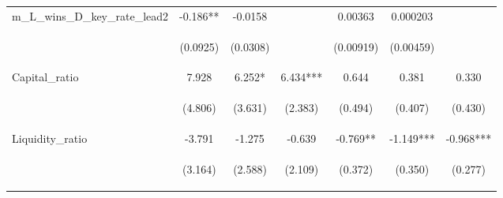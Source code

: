 \documentclass[]{article}
\begin{document}
\begin{center}
\begin{tabular}{lcccccc}
m\_L\_wins\_D\_key\_rate\_lead2 & -0.186** & -0.0158 &  & 0.00363 & 0.000203 &  \\
\vspace{4pt} & \begin{footnotesize}(0.0925)\end{footnotesize} & \begin{footnotesize}(0.0308)\end{footnotesize} & \begin{footnotesize}\end{footnotesize} & \begin{footnotesize}(0.00919)\end{footnotesize} & \begin{footnotesize}(0.00459)\end{footnotesize} & \begin{footnotesize}\end{footnotesize} \\
Capital\_ratio & 7.928 & 6.252* & 6.434*** & 0.644 & 0.381 & 0.330 \\
\vspace{4pt} & \begin{footnotesize}(4.806)\end{footnotesize} & \begin{footnotesize}(3.631)\end{footnotesize} & \begin{footnotesize}(2.383)\end{footnotesize} & \begin{footnotesize}(0.494)\end{footnotesize} & \begin{footnotesize}(0.407)\end{footnotesize} & \begin{footnotesize}(0.430)\end{footnotesize} \\
Liquidity\_ratio & -3.791 & -1.275 & -0.639 & -0.769** & -1.149*** & -0.968*** \\
\vspace{4pt} & \begin{footnotesize}(3.164)\end{footnotesize} & \begin{footnotesize}(2.588)\end{footnotesize} & \begin{footnotesize}(2.109)\end{footnotesize} & \begin{footnotesize}(0.372)\end{footnotesize} & \begin{footnotesize}(0.350)\end{footnotesize} & \begin{footnotesize}(0.277)\end{footnotesize} \\

\end{tabular}
\end{center}
\end{document}

